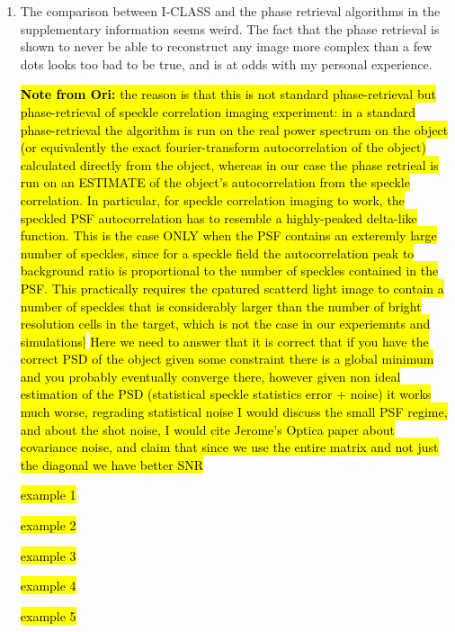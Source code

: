 \documentclass[12pt]{article}
\newcommand{\hlgreen}[1]{\sethlcolor{green!30}\hl{#1}}
\newcommand{\hlred}[1]{\sethlcolor{red!30}\hl{#1}}
\newcommand{\hlyellow}[1]{\sethlcolor{yellow!50}\hl{#1}}
\newcommand{\hlblue}[1]{\sethlcolor{blue!20}\hl{#1}}
\newenvironment{reviewercomment}
    {\begin{tcolorbox}[width=\linewidth,colback=gray!5,colframe=commentcolor!50,title=Reviewer Comment,left=5pt,right=5pt]}
    {\end{tcolorbox}}
\newenvironment{ourresponse}
    {\begin{tcolorbox}[width=\linewidth,breakable,enhanced,colback=gray!5,colframe=responsecolor!50,title=Response,left=5pt,right=5pt]}
    {\end{tcolorbox}}
\begin{document}
\begin{enumerate}[label=\arabic*.]
\begin{enumerate}[label=3.\alph*.]
        \item \leavevmode\vspace{-\baselineskip}
        \begin{reviewercomment}
            The comparison between I-CLASS and the phase retrieval algorithms in the supplementary information seems weird. The fact that the phase retrieval is shown to never be able to reconstruct any image more complex than a few dots looks too bad to be true, and is at odds with my personal experience.
        \end{reviewercomment}
        \begin{ourresponse}
            \hlyellow{\textbf{Note from Ori:}
            the reason is that this is not standard phase-retrieval but phase-retrieval of speckle correlation imaging experiment: in a standard phase-retrieval the algorithm is run on the real power spectrum on the object (or equivalently the exact fourier-transform autocorrelation of the object) calculated directly from the object, whereas in our case the phase retrieal is run on an ESTIMATE of the object’s autocorrelation from the speckle correlation. In particular, for speckle correlation imaging to work, the speckled PSF autocorrelation has to resemble a highly-peaked delta-like function. This is the case ONLY when the PSF contains an exteremly large number of speckles, since for a speckle field the autocorrelation peak to background ratio is proportional to the number of speckles contained in the PSF. This practically requires the cpatured scatterd light image to contain a number of speckles that is considerably larger than the number of bright resolution cells in the target, which is not the case in our experiemnts and simulations]}
  \hlred{Here we need to answer that it is correct that if you have the correct PSD of the object given some constraint there is a global minimum and you probably eventually converge there, however given non ideal estimation of the PSD (statistical speckle statistics error + noise) it works much worse, regrading statistical noise I would discuss the small PSF regime, and about the shot noise, I would cite Jerome's Optica paper about covariance noise, and claim that since we use the entire matrix and not just the diagonal we have better SNR}
            
            
        \end{ourresponse}
        \hl{example 1}
        
        \hlblue{example 2}
        
        \hlgreen{example 3}
        
        \hlred{example 4}
        
        \hlyellow{example 5}
        
    \end{enumerate}
\end{enumerate}



\end{document}

